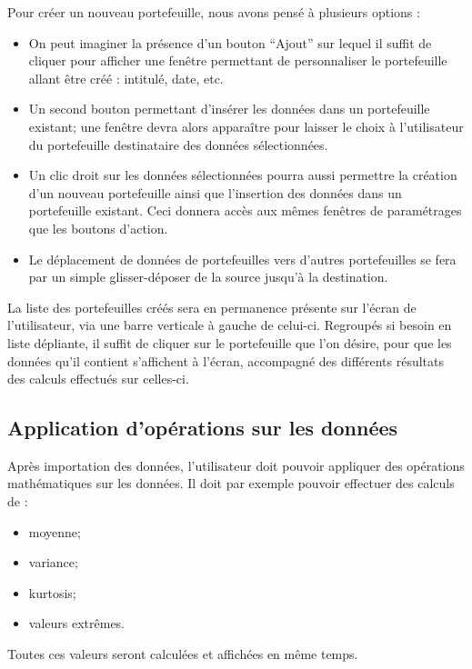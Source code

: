 		Pour créer un nouveau portefeuille, nous avons pensé à plusieurs options :
		\begin{itemize}
			\item On peut imaginer la présence d'un bouton “Ajout” sur lequel il suffit de cliquer pour afficher une fenêtre permettant de personnaliser le portefeuille allant être créé : intitulé, date, etc.
			\item Un second bouton permettant d'insérer les données dans un portefeuille existant; une fenêtre devra alors apparaître pour laisser le choix à l'utilisateur du portefeuille destinataire des données sélectionnées.
			\item Un clic droit sur les données sélectionnées pourra aussi permettre la création d'un nouveau portefeuille ainsi que l'insertion des données dans un portefeuille existant. Ceci donnera accès aux mêmes fenêtres de paramétrages que les boutons d'action.
			\item Le déplacement de données de portefeuilles vers d'autres portefeuilles se fera par un simple glisser-déposer de la source jusqu'à la destination. 
		\end{itemize}

		La liste des portefeuilles créés sera en permanence présente sur l'écran de l'utilisateur, via une barre verticale à gauche de celui-ci.
		Regroupés si besoin en liste dépliante, il suffit de cliquer sur le portefeuille que l'on désire, pour que les données qu'il contient s'affichent à l'écran, accompagné des différents résultats des calculs effectués sur celles-ci. 



	\subsection{Application d'opérations sur les données}

		Après importation des données, l'utilisateur doit pouvoir appliquer des opérations mathématiques sur les données.
		Il doit par exemple pouvoir effectuer des calculs de :
		\begin{itemize}
			\item moyenne;
			\item variance;
			\item kurtosis;
			\item valeurs extrêmes.
		\end{itemize}
		Toutes ces valeurs seront calculées et affichées en même temps.


